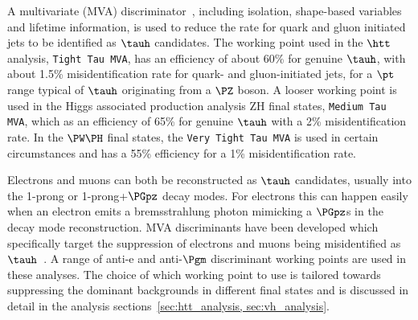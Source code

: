 A multivariate (MVA) discriminator~\cite{Hocker:2007ht}, including isolation, shape-based variables
and lifetime information, is used to reduce the rate for  quark and gluon initiated jets
to be identified as $\tauh$ candidates. The working point used in the $\htt$ analysis, \texttt{Tight Tau MVA},
has an efficiency of about 60\% for genuine $\tauh$,
with about 1.5\% misidentification rate for quark- and gluon-initiated jets, for a $\pt$ range typical 
of $\tauh$ originating from a $\PZ$ boson. A looser working point is used in the Higgs associated 
production analysis ZH final states, \texttt{Medium Tau MVA}, which as an efficiency of 65\% for genuine
$\tauh$ with a 2\% misidentification rate. In the $\PW\PH$ final states, the \texttt{Very Tight Tau MVA}
is used in certain circumstances and has a 55\% efficiency for a 1\% misidentification rate.

Electrons and muons can both be reconstructed as $\tauh$ candidates, usually into the 1-prong or
1-prong+$\PGpz$ decay modes. For electrons this can happen easily when an electron emits a bremsstrahlung
photon mimicking a $\PGpz$s in the decay mode reconstruction. MVA discriminants have been developed 
which specifically target the suppression of electrons and muons being misidentified as 
$\tauh$~\cite{Khachatryan:2015dfa, CMS-PAS-TAU-16-002}.
A range of anti-e and anti-$\Pgm$ discriminant working points are used in these analyses. The choice
of which working point to use is tailored towards suppressing the dominant backgrounds in different
final states and is discussed in detail in the analysis sections~\ref{sec:htt_analysis, sec:vh_analysis}.


